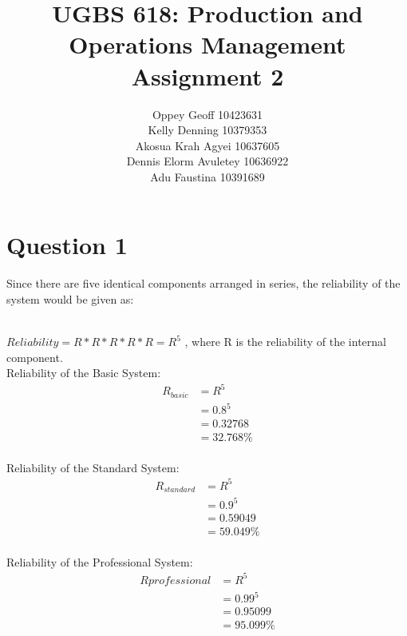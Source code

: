 \documentclass[12pt]{article}
\title{UGBS 618: Production and Operations Management\\
	Assignment 2}
\author{Oppey Geoff 10423631 \\
	Kelly Denning 10379353\\
	Akosua Krah Agyei	10637605\\
	Dennis Elorm Avuletey    10636922\\
	Adu Faustina	10391689\\}
\date{}
\begin{document}
	
	\maketitle
	
	\section*{Question 1}
	Since there are five identical components arranged in series, the reliability of the system would be given as:\\
	
	\\
	
	$ Reliability = R * R * R * R * R = R ^ 5$ , where R is the reliability of the internal component.\\
	
	Reliability of the Basic System:\\
	\begin{align*}
	R_{basic} &= R^5\\
	&= 0.8^5\\
	&= 0.32768\\
	&= 32.768\%\\
	\end{align*}
	
	
	Reliability of the Standard System:\\
	\begin{align*}
	R_{standard} &= R^5\\
	&= 0.9^5\\
	&= 0.59049\\
	&= 59.049\%\\
	\end{align*}
	
	Reliability of the Professional System:\\
	\begin{align*}
	R{professional} &= R^5\\
	&= 0.99^5\\
	&= 0.95099\\
	&= 95.099\%\\
	\end{align*}
	
\end{document}
